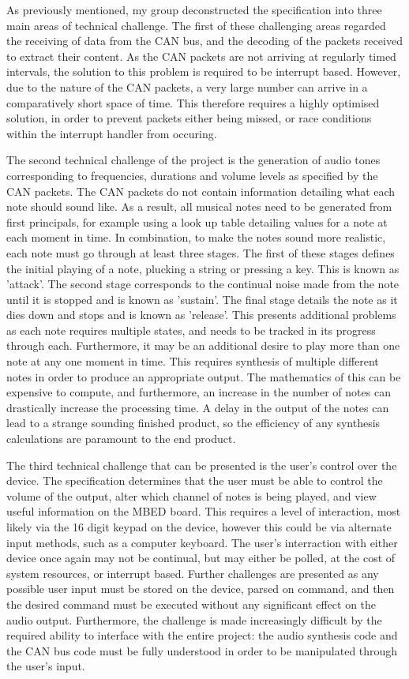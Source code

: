 As previously mentioned, my group deconstructed the specification into three 
main areas of technical challenge. The first of these challenging areas regarded 
the receiving of data from the CAN bus, and the decoding of the packets received
to extract their content. As the CAN packets are not arriving at regularly 
timed intervals, the solution to this problem is required to be interrupt based. 
However, due to the nature of the CAN packets, a very large number can arrive in 
a comparatively short space of time. This therefore requires a highly optimised 
solution, in order to prevent packets either being missed, or race conditions 
within the interrupt handler from occuring. 
\par\bigskip\noindent
The second technical challenge of the project is the generation of audio tones 
corresponding to frequencies, durations and volume levels as specified by the CAN 
packets. The CAN packets do not contain information detailing what each note 
should sound like. As a result, all musical notes need to be generated from 
first principals, for example using a look up table detailing values for a note 
at each moment in time. In combination, to make the notes sound more realistic, 
each note must go through at least three stages. The first of these stages 
defines the initial playing of a note, plucking a string or pressing a key. This
 is known as 'attack'. The second stage corresponds to the continual noise made 
from the note until it is stopped and is known as 'sustain'. The final stage 
details the note as it dies down and stops and is known as 'release'. This 
presents additional problems as each note requires multiple states, and needs to 
be tracked in its progress through each. 
Furthermore, it may be an additional desire to play more than one note at any 
one moment in time. This requires synthesis of multiple different notes in order 
to produce an appropriate output. The mathematics of this can be expensive to 
compute, and furthermore, an increase in the number of notes can drastically 
increase the processing time. A delay in the output of the notes can lead to 
a strange sounding finished product, so the efficiency of any synthesis 
calculations are paramount to the end product. 
\par\bigskip\noindent
The third technical challenge that can be presented is the user's control over 
the device. The specification determines that the user must be able to control 
the volume of the output, alter which channel of notes is being played, 
and view useful information on the MBED board. This requires a level of
interaction, most likely via the 16 digit keypad on the device, however this 
could be via alternate input methods, such as a computer keyboard. The user's 
interraction with either device once again may not be continual, but may either 
be polled, at the cost of system resources, or interrupt based. Further 
challenges are presented as any possible user input must be stored on the device, 
parsed on command, and then the desired command must be executed without any 
significant effect on the audio output. Furthermore, the challenge is made 
increasingly difficult by the required ability to interface with the entire 
project: the audio synthesis code and the CAN bus code must be fully understood 
in order to be manipulated through the user's input. 
